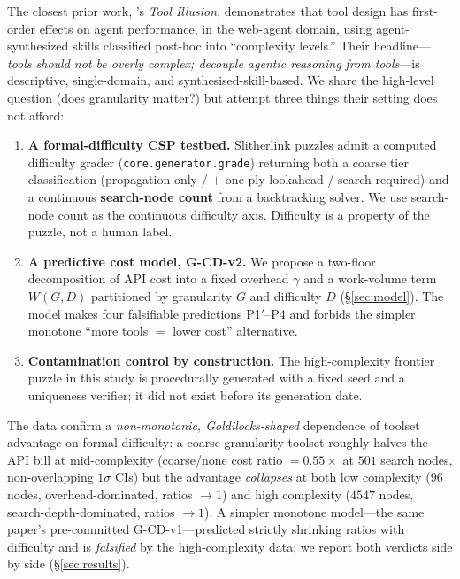 \documentclass[11pt,letterpaper]{article}
\begin{document}
The closest prior work, \citet{lou2026illusion}'s \emph{Tool
Illusion}, demonstrates that tool design has first-order effects on
agent performance, in the web-agent domain, using agent-synthesized
skills classified post-hoc into ``complexity levels.'' Their
headline---\emph{tools should not be overly complex; decouple
agentic reasoning from tools}---is descriptive, single-domain, and
synthesised-skill-based. We share the high-level question (does
granularity matter?) but attempt three things their setting does
not afford:

\begin{enumerate}
  \item \textbf{A formal-difficulty CSP testbed.} Slitherlink
    puzzles admit a computed difficulty grader
    (\texttt{core.generator.grade}) returning both a coarse tier
    classification (propagation only / $+$ one-ply lookahead /
    search-required) and a continuous \textbf{search-node count}
    from a backtracking solver. We use search-node count as the
    continuous difficulty axis. Difficulty is a property of the
    puzzle, not a human label.
  \item \textbf{A predictive cost model, G-CD-v2.} We propose a
    two-floor decomposition of API cost into a fixed overhead
    $\gamma$ and a work-volume term $W(G, D)$ partitioned by
    granularity $G$ and difficulty $D$ (\S\ref{sec:model}). The model
    makes four falsifiable predictions \textsc{P1$'$}--\textsc{P4}
    and forbids the simpler monotone ``more tools $=$ lower cost''
    alternative.
  \item \textbf{Contamination control by construction.} The
    high-complexity frontier puzzle in this study is procedurally
    generated with a fixed seed and a uniqueness verifier; it did
    not exist before its generation date.
\end{enumerate}

The data confirm a \emph{non-monotonic, Goldilocks-shaped}
dependence of toolset advantage on formal difficulty: a
coarse-granularity toolset roughly halves the API bill at
mid-complexity (coarse/none cost ratio $= 0.55\times$ at $501$
search nodes, non-overlapping $1\sigma$ CIs) but the advantage
\emph{collapses} at both low complexity ($96$ nodes,
overhead-dominated, ratios $\to 1$) and high complexity ($4547$
nodes, search-depth-dominated, ratios $\to 1$). A simpler monotone
model---the same paper's pre-committed G-CD-v1---predicted strictly
shrinking ratios with difficulty and is \emph{falsified} by the
high-complexity data; we report both verdicts side by side
(\S\ref{sec:results}).
\end{document}
